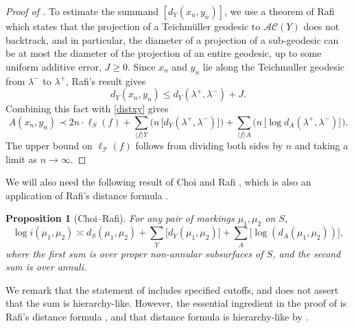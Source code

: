 \documentclass[11pt,letterpaper]{amsart}
\newcommand{\mr}{\mathring}
\newcommand{\teich}{\mathcal T}
\numberwithin{equation}{section}
\newtheorem{proposition}[theorem]{Proposition}
\theoremstyle{definition}
\begin{document}
\begin{proof}[Proof of ]
To estimate the summand $[d_{Y}(x_{n}, y_{n})]$, we use 
a theorem of Rafi~\cite[Theorem 6.1]{Rafi:Hyperbolicity}
which states that the projection of a Teichm{\"u}ller geodesic to $\mathcal{AC}(Y)$ does not backtrack, and in particular, the diameter of a projection of a sub-geodesic can be at most the diameter of the projection of an entire geodesic, up to some uniform additive error, $J\ge 0$. Since $x_n$ and $y_n$ lie along the Teichmuller geodesic from $\lambda^-$ to $\lambda^+$, Rafi's result gives
\[ d_{Y}(x_{n}, y_{n}) \leq d_{Y}(\lambda^{+}, \lambda^{-}) + J. \]
Combining this fact with \eqref{distxy} gives
\[ A(x_{n}, y_{n}) \prec 2n \cdot  \ell_{S}(f)  +   \sum_{\langle f \rangle Y} \Big( n \,  \big[ d_Y(\lambda^+,\lambda^-) \big]_{}  \Big) +  \sum_{\langle f \rangle A} \Big( n \,  \big[ \log d_A(\lambda^+,\lambda^-) \big]_{} \Big).  \]
The upper bound on $\ell_{\teich}(f)$ follows from dividing both sides  by $n$ and taking a limit as $n \rightarrow \infty$. 
%

\end{proof}





We will also need the following result of Choi and  Rafi \cite[Corollary D]{choi2007comparison}, which is also an application of Rafi's distance formula \cite[Theorem 2.4]{Rafi:Hyperbolicity}.

\begin{proposition}[Choi--Rafi]\label{Prop:ChoiRafi}
For any pair of markings $\mu_1,\mu_2$ on $S$,
\[
\log i(\mu_1,\mu_2) \asymp d_S (\mu_1, \mu_2) + \sum_Y \big[ d_Y(\mu_1,\mu_2) \big] + \sum_A \big[ \log \left (d_A(\mu_1,\mu_2) \right ) \big],
\]
where the first sum is over proper non-annular subsurfaces of $S$, and the second sum is over annuli. 
\end{proposition}

We remark that the statement of \cite[Corollary D]{choi2007comparison} includes specified cutoffs, and does not assert that the sum is hierarchy-like. However, the essential ingredient in the proof of \cite[Corollary D]{choi2007comparison} is Rafi's distance formula  \cite[Theorem 2.4]{Rafi:Hyperbolicity}, and that distance formula is hierarchy-like by  \cite[Remark 2.5]{Rafi:Hyperbolicity}.
\end{document}
